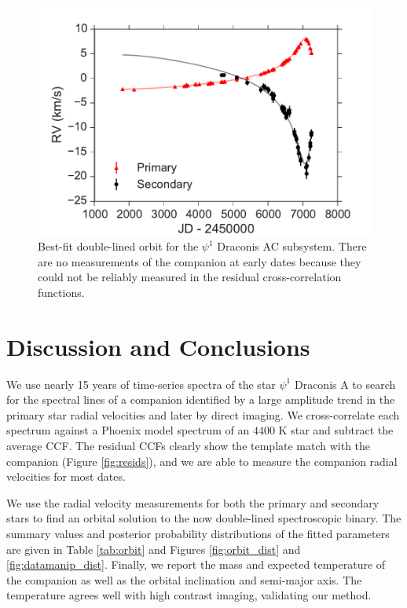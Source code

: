 \documentclass[twocolumn]{emulateapj}
\begin{document}
\begin{figure}

  \includegraphics[width=\columnwidth]{SB2_Orbit.pdf}
  \caption{Best-fit double-lined orbit for the $\psi^1$ Draconis AC subsystem. There are no measurements of the companion at early dates because they could not be reliably measured in the residual cross-correlation functions.}
  \label{fig:orbit}
  
\end{figure}



\section{Discussion and Conclusions}

We use nearly 15 years of time-series spectra of the star $\psi^1$ Draconis A to search for the spectral lines of a companion identified by a large amplitude trend in the primary star radial velocities and later by direct imaging. We cross-correlate each spectrum against a Phoenix model spectrum of an $4400$ K star and subtract the average CCF. The residual CCFs clearly show the template match with the companion (Figure \ref{fig:resids}), and we are able to measure the companion radial velocities for most dates. 

We use the radial velocity measurements for both the primary and secondary stars to find an orbital solution to the now double-lined spectroscopic binary. The summary values and posterior probability distributions of the fitted parameters are given in Table \ref{tab:orbit} and Figures \ref{fig:orbit_dist} and \ref{fig:datamanip_dist}. Finally, we report the mass and expected temperature of the companion as well as the orbital inclination and semi-major axis. The temperature agrees well with high contrast imaging, validating our method.
\end{document}
